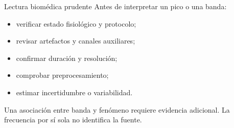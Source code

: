 \documentclass[
  ignorenonframetext,
  aspectratio=169,
  spanish,
]{beamer}
\providecommand{\faExclamation}{\faIcon{exclamation}}
\providecommand{\tightlist}{%
  \setlength{\itemsep}{0pt}\setlength{\parskip}{0pt}}
\begin{document}
\begin{frame}{Lectura biomédica prudente}
  \protect{}\label{lectura-biomuxe9dica-prudente}
  Antes de interpretar un pico o una banda:

  \begin{itemize}
    \tightlist
    \item
          verificar estado fisiológico y protocolo;
    \item
          revisar artefactos y canales auxiliares;
    \item
          confirmar duración y resolución;
    \item
          comprobar preprocesamiento;
    \item
          estimar incertidumbre o variabilidad.
  \end{itemize}

  \begin{tcolorbox}[enhanced jigsaw, arc=.35mm, bottomrule=.15mm, bottomtitle=1mm, breakable, colback=white, colbacktitle=quarto-callout-important-color!10!white, colframe=quarto-callout-important-color-frame, coltitle=black, left=2mm, leftrule=.75mm, opacityback=0, opacitybacktitle=0.6, rightrule=.15mm, title=\textcolor{quarto-callout-important-color}{\faExclamation}\hspace{0.5em}{Importante}, titlerule=0mm, toprule=.15mm, toptitle=1mm]

    Una asociación entre banda y fenómeno requiere evidencia adicional. La
    frecuencia por sí sola no identifica la fuente.

  \end{tcolorbox}
\end{frame}
\end{document}
